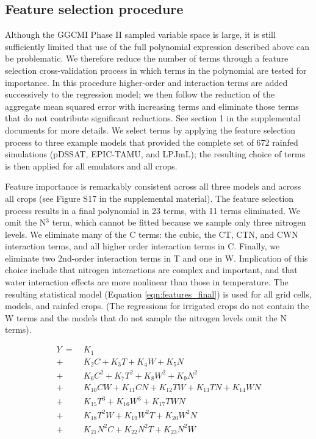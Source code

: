 \documentclass[gmd, manuscript]{copernicus} %
\begin{document}
\subsection{Feature selection procedure}
Although the GGCMI Phase II sampled variable space is large, it is still sufficiently limited that use of the full polynomial expression described above can be problematic. We therefore reduce the number of terms through a feature selection cross-validation process in which terms in the polynomial are tested for importance. In this procedure higher-order and interaction terms are added successively to the regression model; we then follow the reduction of the aggregate mean squared error with increasing terms and eliminate those terms that do not contribute significant reductions. See section 1 in the supplemental documents for more details. We select terms by applying the feature selection process to three example models that provided the complete set of 672 rainfed simulations (pDSSAT, EPIC-TAMU, and LPJmL); the resulting choice of terms is then applied for all emulators and all crops.


Feature importance is remarkably consistent across all three models and across all crops (see Figure S17 in the supplemental material). The feature selection process results in a final polynomial in 23 terms, with 11 terms eliminated. We omit the N$^3$ term, which cannot be fitted because we sample only three nitrogen levels. We eliminate many of the C terms: the cubic, the CT, CTN, and CWN interaction terms, and all higher order interaction terms in C. Finally, we eliminate two 2nd-order interaction terms in T and one in W. Implication of this choice include that nitrogen interactions are complex and important, and that water interaction effects are more nonlinear than those in temperature. The resulting statistical model (Equation \ref{eqn:features_final}) is used for all grid cells, models, and rainfed crops. (The regressions for irrigated crops do not contain the W terms and the models that do not sample the nitrogen levels omit the N terms).

\begin{align}
    \label{eqn:features_final}
    Y\ = \ & K_{1}  \\
		+ \ & K_{2}  C     + K_{3}  T     + K_{4}  W     + K_{5}  N   \nonumber \\
		+ \ & K_{6}  C^2   + K_{7}  T^2   + K_{8}  W^2   + K_{9}  N^2 \nonumber \\
		+ \ & K_{10} C W   + K_{11} C N   + K_{12} T W   + K_{13} T N + K_{14} W N \nonumber \\ %
		+ \ & K_{15} T^3   + K_{16} W^3   + K_{17} T W N  \nonumber \\ %
		+ \ & K_{18} T^2 W + K_{19} W^2 T + K_{20} W^2 N  \nonumber \\ %
		+ \ & K_{21} N^2 C + K_{22} N^2 T + K_{23} N^2 W  \nonumber    %
\end{align}
\end{document}
